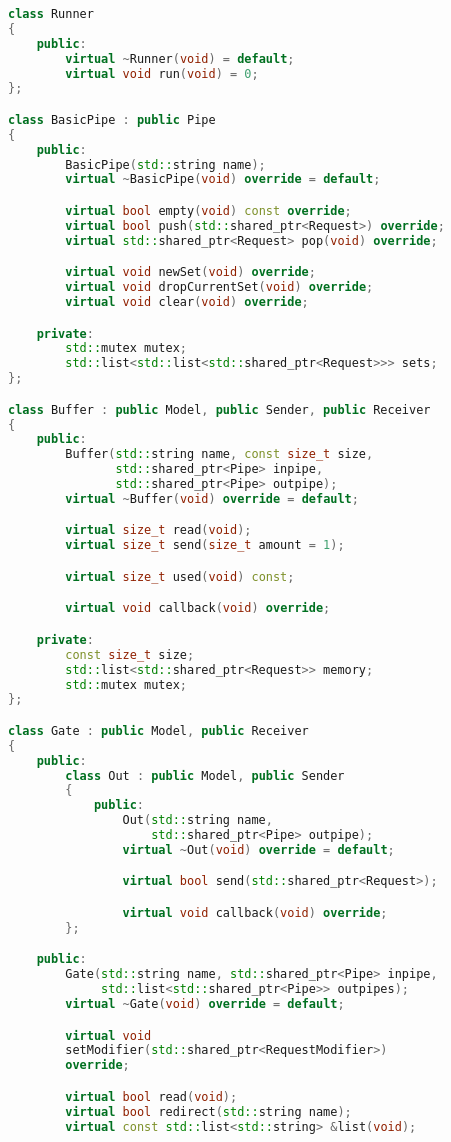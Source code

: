 \begin{lstlisting}[caption={Реализация элементов системы}, language=c++]
class Runner
{
    public:
        virtual ~Runner(void) = default;
        virtual void run(void) = 0;
};

class BasicPipe : public Pipe
{
    public:
        BasicPipe(std::string name);
        virtual ~BasicPipe(void) override = default;

        virtual bool empty(void) const override;
        virtual bool push(std::shared_ptr<Request>) override;
        virtual std::shared_ptr<Request> pop(void) override;

        virtual void newSet(void) override;
        virtual void dropCurrentSet(void) override;
        virtual void clear(void) override;

    private:
        std::mutex mutex;
        std::list<std::list<std::shared_ptr<Request>>> sets;
};

class Buffer : public Model, public Sender, public Receiver
{
    public:
        Buffer(std::string name, const size_t size,
               std::shared_ptr<Pipe> inpipe,
               std::shared_ptr<Pipe> outpipe);
        virtual ~Buffer(void) override = default;

        virtual size_t read(void);
        virtual size_t send(size_t amount = 1);

        virtual size_t used(void) const;

        virtual void callback(void) override;

    private:
        const size_t size;
        std::list<std::shared_ptr<Request>> memory;
        std::mutex mutex;
};

class Gate : public Model, public Receiver
{
    public:
        class Out : public Model, public Sender
        {
            public:
                Out(std::string name,
                    std::shared_ptr<Pipe> outpipe);
                virtual ~Out(void) override = default;

                virtual bool send(std::shared_ptr<Request>);

                virtual void callback(void) override;
        };

    public:
        Gate(std::string name, std::shared_ptr<Pipe> inpipe,
             std::list<std::shared_ptr<Pipe>> outpipes);
        virtual ~Gate(void) override = default;

        virtual void
        setModifier(std::shared_ptr<RequestModifier>)
        override;

        virtual bool read(void);
        virtual bool redirect(std::string name);
        virtual const std::list<std::string> &list(void);


\end{lstlisting}
